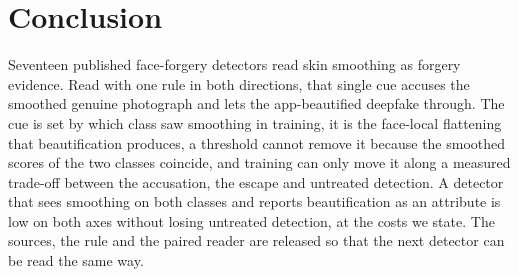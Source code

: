 \documentclass[conference]{IEEEtran}
\begin{document}
\section{Conclusion}
Seventeen published face-forgery detectors read skin smoothing as forgery evidence. Read with one rule in both directions,
that single cue accuses the smoothed genuine photograph and lets the app-beautified deepfake through. The cue is set by which
class saw smoothing in training, it is the face-local flattening that beautification produces, a threshold cannot remove it
because the smoothed scores of the two classes coincide, and training can only move it along a measured trade-off between
the accusation, the escape and untreated detection. A detector that sees smoothing on both classes and reports
beautification as an attribute is low on both axes without losing untreated detection, at the costs we state. The sources,
the rule and the paired reader are released so that the next detector can be read the same way.



\end{document}
